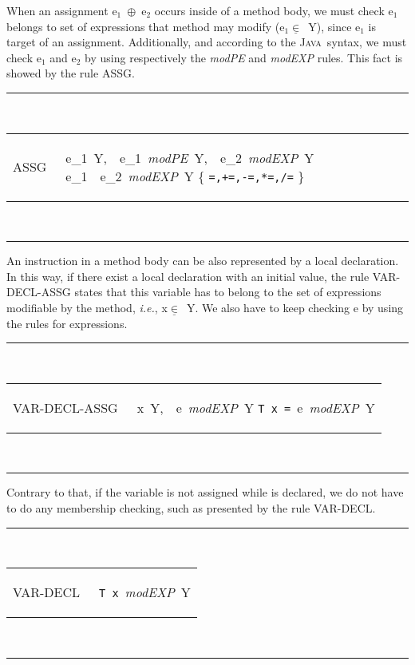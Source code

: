 \documentclass[a4paper]{llncs}
\newcommand{\java}{\textsc{Java}}
\begin{document}
When an assignment \textup{e}$_1$\ $\oplus$\
\textup{e}$_2$ occurs inside of a method body, we must check
\textup{e}$_1$ belongs to set of expressions that method may modify
(\textup{e}$_1\underline{\in}$\ \textsc{Y}), since \textup{e}$_1$ is
target of an assignment. Additionally, and according to the
\java~syntax, we must check \textup{e}$_1$ and \textup{e}$_2$ by
using respectively the \textit{modPE} and \textit{modEXP} rules. This
fact is showed by the rule \textup{ASSG}.
\begin{table}[hbt] %
\rule{\linewidth}{0.25mm}
\\[0.5ex]
\begin{tabular}{ll}
ASSG\,\,\, & 
\begin{prooftree}
\textup{e}_1\underline{\in}\ \textsc{Y},\ \ \textup{e}_1\
\textit{modPE}\ \textsc{Y},\ \ \textup{e}_2\ \textit{modEXP}\
\textsc{Y}
\justifies
\textup{e}_1\ \oplus\ \textup{e}_2\ \textit{modEXP}\ \textsc{Y}
\using
\oplus \in \{ \texttt{=,+=,-=,*=,/=} \}
\end{prooftree}
\end{tabular}
\\[0.5ex]
\rule{\linewidth}{0.25mm}
\end{table} %

An instruction in a method body can be also represented by a local
declaration. In this way, if there exist a local declaration with an
initial value, the rule \textup{VAR-DECL-ASSG} states that this
variable has
to belong to the set of expressions modifiable by the method, \emph{i.e.},
\textup{x}$\underline{\in}$\ \textsc{Y}. We also have to keep checking 
\textup{e} by using the rules for expressions.
\begin{table}[hbt] %
\rule{\linewidth}{0.25mm}
\\[0.5ex]
\begin{tabular}{ll}
VAR-DECL-ASSG\,\,\, & 
\begin{prooftree}
\rule[1ex]{0em}{1.5ex}
\textup{x}\underline{\in}\ \textsc{Y},\ \ \textup{e}\ \textit{modEXP}\ \textsc{Y}
\justifies
\texttt{T x =}\ \textup{e}\ \textit{modEXP}\ \textsc{Y}
\end{prooftree}
\end{tabular}
\\[0.5ex]
\rule{\linewidth}{0.25mm}
\end{table} %

Contrary to that, if the variable is not
assigned while is declared, we do not have to do any
membership checking, such as presented by the rule \textup{VAR-DECL}.
\begin{table}[hbt] %
\rule{\linewidth}{0.25mm}
\\[0.5ex]
\begin{tabular}{ll}
VAR-DECL\,\,\, & 
\begin{prooftree}
\justifies
\texttt{T x}\ \textit{modEXP}\ \textsc{Y}
\using
\end{prooftree}
\end{tabular}
\\[0.5ex]
\rule{\linewidth}{0.25mm}
\end{table} %
\end{document}
